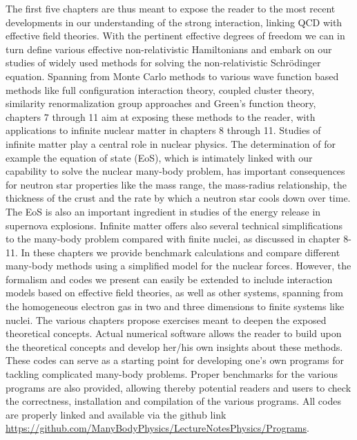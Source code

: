 The first five chapters are thus meant to expose the reader to the
most recent developments in our understanding of the strong
interaction, linking QCD with effective field theories. With the
pertinent effective degrees of freedom we can in turn define various
effective non-relativistic Hamiltonians and embark on our studies of
widely used methods for solving the non-relativistic Schr\"odinger
equation. Spanning from Monte Carlo methods to various wave function
based methods like full configuration interaction theory, coupled
cluster theory, similarity renormalization group approaches and
Green's function theory, chapters 7 through 11 aim at exposing these
methods to the reader, with applications to infinite nuclear matter in
chapters 8 through 11. Studies of infinite matter play a central role
in nuclear physics. The determination of for example the equation of
state (EoS), which is intimately linked with our capability to solve
the nuclear many-body problem, has important consequences for neutron
star properties like the mass range, the mass-radius relationship, the
thickness of the crust and the rate by which a neutron star cools down
over time. The EoS is also an important ingredient in studies of the
energy release in supernova explosions. Infinite matter offers also
several technical simplifications to the many-body problem compared
with finite nuclei, as discussed in chapter 8-11. In these chapters we
provide benchmark calculations and compare different many-body methods
using a simplified model for the nuclear forces. However, the
formalism and codes we present can easily be extended to include
interaction models based on effective field theories, as well as other
systems, spanning from the homogeneous electron gas in two and three
dimensions to finite systems like nuclei.  The various chapters
propose exercises meant to deepen the exposed theoretical concepts.
Actual numerical software allows the reader to build upon the
theoretical concepts and develop her/his own insights about these
methods. These codes can serve as a starting point for developing
one's own programs for tackling complicated many-body problems.
Proper benchmarks for the various programs are also provided, allowing
thereby potential readers and users to check the correctness,
installation and compilation of the various programs. All codes are
properly linked and available via the github
link \url{https://github.com/ManyBodyPhysics/LectureNotesPhysics/Programs}.


